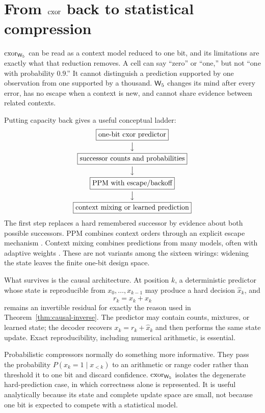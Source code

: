 \section{From \texorpdfstring{$\mathrm{cxor}$}{cxor} back to statistical compression}\label{sec:ladder}

$\mathrm{cxor}_{\mathsf{W}_{5}}$ can be read as a context model reduced to one bit, and its limitations are exactly
what that reduction removes.  A cell can say ``zero'' or ``one,'' but not ``one with probability
$0.9$.''  It cannot distinguish a prediction supported by one observation from one supported by
a thousand.  $\mathsf{W}_{5}$ changes its mind after every error, has no escape when a context is new, and
cannot share evidence between related contexts.

Putting capacity back gives a useful conceptual ladder:
\[
\begin{gathered}
\boxed{\text{one-bit $\mathrm{cxor}$ predictor}}\\[-1pt]
\big\downarrow\\[-1pt]
\boxed{\text{successor counts and probabilities}}\\[-1pt]
\big\downarrow\\[-1pt]
\boxed{\text{PPM with escape/backoff}}\\[-1pt]
\big\downarrow\\[-1pt]
\boxed{\text{context mixing or learned prediction}}
\end{gathered}
\]
The first step replaces a hard remembered successor by evidence about both possible successors.
PPM combines context orders through an explicit escape mechanism \cite{bell1990text}.  Context
mixing combines predictions from many models, often with adaptive weights
\cite{Mahoney2005AdaptiveWO}.  These are not variants among the sixteen wirings: widening the
state leaves the finite one-bit design space.

What survives is the causal architecture.  At position $k$, a deterministic predictor whose
state is reproducible from $x_0,\dots,x_{k-1}$ may produce a hard decision $\hat x_k$, and
\[
  r_k=x_k+\hat x_k
\]
remains an invertible residual for exactly the reason used in
Theorem~\ref{thm:causal-inverse}.  The predictor may contain counts, mixtures, or learned state;
the decoder recovers $x_k=r_k+\hat x_k$ and then performs the same state update.  Exact
reproducibility, including numerical arithmetic, is essential.

Probabilistic compressors normally do something more informative.  They pass the probability
$P(x_k=1\mid x_{<k})$ to an arithmetic or range coder rather than threshold it to one bit and
discard confidence.  $\mathrm{cxor}_{\mathsf{W}_{5}}$ isolates the degenerate hard-prediction case, in which correctness alone
is represented.  It is useful analytically because its state and complete update space are small,
not because one bit is expected to compete with a statistical model.

